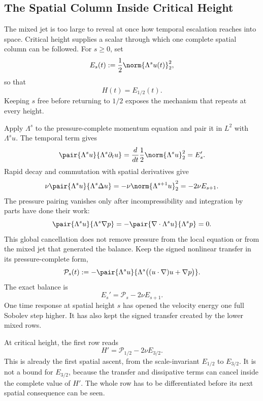 
\subsection{The Spatial Column Inside Critical Height}\label{sub:TheSpatialColumnInsideCriticalHeight}

The mixed jet is too large to reveal at once how temporal escalation reaches into space.
Critical height supplies a scalar through which one complete spatial column can be followed.
For \(s\ge0\), set
\[
  E_s(t)
  :=
  \frac12\norm{\Lambda^su(t)}_2^2,
\]
so that
\[
  H(t)=E_{1/2}(t).
\]
Keeping \(s\) free before returning to \(1/2\) exposes the mechanism that repeats at every height.

Apply \(\Lambda^s\) to the pressure-complete momentum equation and pair it in \(L^2\) with \(\Lambda^su\).
The temporal term gives
\[
  \pair{\Lambda^su}{\Lambda^s\partial_tu}
  =
  \frac{d}{dt}\frac12\norm{\Lambda^su}_2^2
  =
  E_s'.
\]
Rapid decay and commutation with spatial derivatives give
\[
  \nu\pair{\Lambda^su}{\Lambda^s\Delta u}
  =
  -\nu\norm{\Lambda^{s+1}u}_2^2
  =
  -2\nu E_{s+1}.
\]
The pressure pairing vanishes only after incompressibility and integration by parts have done their work:
\[
  \pair{\Lambda^su}{\Lambda^s\nabla p}
  =
  -\pair{\nabla\cdot\Lambda^su}{\Lambda^sp}
  =
  0.
\]
This global cancellation does not remove pressure from the local equation or from the mixed jet that generated the balance.
Keep the signed nonlinear transfer in its pressure-complete form,
\[
  \mathcal P_s(t)
  :=
  -\pair{\Lambda^su}
  {\Lambda^s\bigl((u\cdot\nabla)u+\nabla p\bigr)}.
\]
The exact balance is
\[
  E_s'
  =
  \mathcal P_s-2\nu E_{s+1}.
\]
One time response at spatial height \(s\) has opened the velocity energy one full Sobolev step higher.
It has also kept the signed transfer created by the lower mixed rows.

At critical height, the first row reads
\[
  H'
  =
  \mathcal P_{1/2}-2\nu E_{3/2}.
\]
This is already the first spatial ascent, from the scale-invariant \(E_{1/2}\) to \(E_{3/2}\).
It is not a bound for \(E_{3/2}\), because the transfer and dissipative terms can cancel inside the complete value of \(H'\).
The whole row has to be differentiated before its next spatial consequence can be seen.

